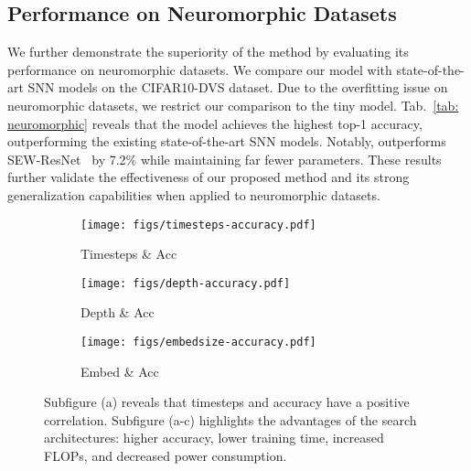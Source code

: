 \documentclass{article}
\theoremstyle{plain}
\theoremstyle{definition}
\theoremstyle{remark}
\begin{document}
\subsection{Performance on Neuromorphic Datasets}

We further demonstrate the superiority of the \sysname method by evaluating its performance on neuromorphic datasets. We compare our model with state-of-the-art SNN models on the CIFAR10-DVS dataset. Due to the overfitting issue on neuromorphic datasets, we restrict our comparison to the tiny model. Tab.~\ref{tab: neuromorphic} reveals that the \sysname model achieves the highest top-1 accuracy, outperforming the existing state-of-the-art SNN models. Notably, \sysname outperforms SEW-ResNet~\cite{zhengGoingDeeperDirectlytrained2021} by 7.2\% while maintaining far fewer parameters. These results further validate the effectiveness of our proposed method and its strong generalization capabilities when applied to neuromorphic datasets.







\begin{figure}[t]
     \centering
\vskip -0.2in   
     \begin{subfigure}[b]{0.15\textwidth}
         \centering
         \texttt{[image: figs/timesteps-accuracy.pdf]}
         \caption{Timesteps \& Acc}
         \label{fig:timesteps-accuracy}
     \end{subfigure}
     \hfill
     \begin{subfigure}[b]{0.15\textwidth}
         \centering
         \texttt{[image: figs/depth-accuracy.pdf]}
         \caption{Depth \& Acc}
         \label{fig:depth-accuracy}
     \end{subfigure}
     \hfill
    \begin{subfigure}[b]{0.15\textwidth}
         \centering
         \texttt{[image: figs/embedsize-accuracy.pdf]}
         \caption{Embed \& Acc}
         \label{fig:embedsize-accuracy}
     \end{subfigure}
        \caption{Subfigure (a) reveals that timesteps and accuracy have a positive correlation. Subfigure (a-c) highlights the advantages of the search \sysname architectures: higher accuracy, lower training time, increased FLOPs, and decreased power consumption. }   
        \label{fig:four-graphs}
\vskip -0.2in   
\end{figure}
\end{document}
